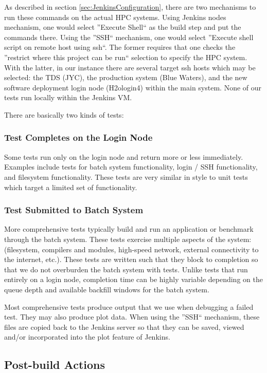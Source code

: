 \documentclass[AMA]{WileyNJD-v1}
\begin{document}
As described in section \ref{sec:JenkinsConfiguration}, there are two mechanisms to run these commands on the actual HPC systems. 
Using Jenkins nodes mechanism, one would select ''Execute Shell`` as the build step and put the commands there. Using the ''SSH`` mechanism, one would select ''Execute shell script on remote host using ssh``. 
The former requires that one checks the ''restrict where this project can be run`` selection to specify the HPC system. 
With the latter, in our instance there are several target ssh hosts which may be selected: the TDS (JYC), the production system (Blue Waters), and the new software deployment login node (H2ologin4) within the main system. 
None of our tests run locally within the Jenkins VM.

There are basically two kinds of tests: 

\subsubsection{Test Completes on the Login Node}
Some tests run only on the login node and return more or less immediately. 
Examples include tests for batch system functionality, login / SSH functionality, and filesystem functionality. 
These tests are very similar in style to unit tests which target a limited set of functionality.

\subsubsection{Test Submitted to Batch System}
More comprehensive tests typically build and run an application or benchmark through the batch system.  
These tests exercise multiple aspects of the system: (filesystem, compilers and modules, high-speed network, external connectivity to the internet, etc.). 
These tests are written such that they block to completion so that we do not overburden the batch system with tests. 
Unlike tests that run entirely on a login node, completion time can be highly variable depending on the queue depth and available backfill windows for the batch system.
 

Most comprehensive tests produce output that we use when debugging a failed test. 
They may also produce plot data. When using the ''SSH`` mechanism, these files are copied back to the Jenkins server so that they can be saved, viewed and/or incorporated into the plot feature of Jenkins. 
 
\subsection{Post-build Actions}
\end{document}
